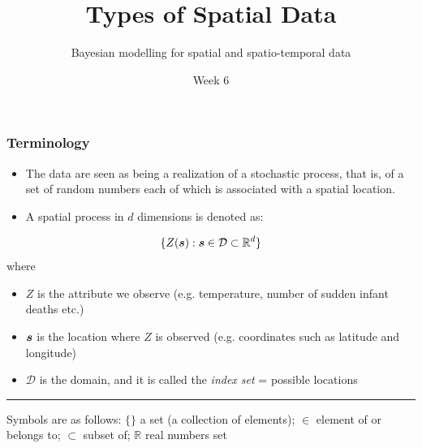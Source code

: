 \documentclass[12pt]{beamer}
\title{Types of Spatial Data}
\subtitle{}
\author{Bayesian modelling for spatial and spatio-temporal data}
\institute{MSc in Epidemiology}
\date{Week 6}
\newcommand{\bs}{ \mbox{\boldmath $s$}}
\begin{document}
\begin{frame}[t]
  \titlepage
\end{frame}


\begin{frame}
\frametitle{Terminology}
\begin{itemize}
  \item The data are seen as being a realization of a stochastic process, that is, of a set of random numbers each of which is associated with a spatial location.
 \item A spatial process in $d$ dimensions is denoted as:
\end{itemize}
\begin{equation*}
  \{Z(\bs): \bs \in \mathcal{D} \subset \mathbb{R}^d\}
\end{equation*}
where
\begin{itemize}
  \item $Z$ is the attribute we observe (e.g. temperature, number of sudden infant deaths etc.)
  \item $\bs$ is the location where $Z$ is observed (e.g. coordinates such as latitude and longitude)
  \item $\mathcal{D}$ is the domain, and it is called the \emph{index set} = possible locations
\end{itemize}
\vspace{10pt}
\rule{\textwidth}{0.4pt}
\tiny{Symbols are as follows: $\{\}$ a set (a collection of elements); $\in$ element of or belongs to; $\subset$ subset of; $\mathbb{R}$ real numbers set}
\end{frame}
\end{document}
